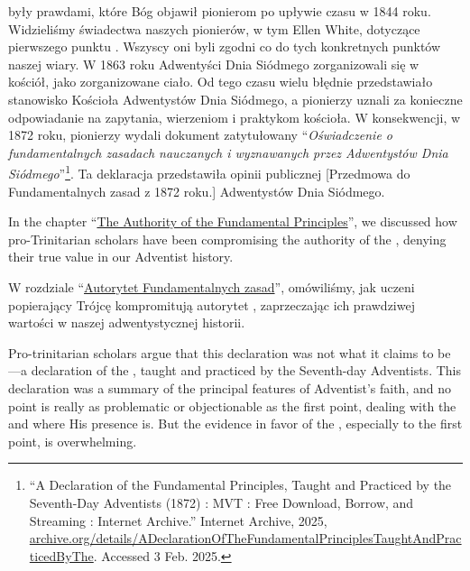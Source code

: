  były prawdami, które Bóg objawił pionierom po upływie czasu w 1844 roku. Widzieliśmy świadectwa naszych pionierów, w tym Ellen White, dotyczące pierwszego punktu . Wszyscy oni byli zgodni co do tych konkretnych punktów naszej wiary. W 1863 roku Adwentyści Dnia Siódmego zorganizowali się w kościół, jako zorganizowane ciało. Od tego czasu wielu błędnie przedstawiało stanowisko Kościoła Adwentystów Dnia Siódmego, a pionierzy uznali za konieczne odpowiadanie na zapytania,  wierzeniom i praktykom kościoła. W konsekwencji, w 1872 roku, pionierzy wydali dokument zatytułowany “\textit{Oświadczenie o fundamentalnych zasadach nauczanych i wyznawanych przez Adwentystów Dnia Siódmego}”\footnote{“A Declaration of the Fundamental Principles, Taught and Practiced by the Seventh-Day Adventists (1872) : MVT : Free Download, Borrow, and Streaming : Internet Archive.” Internet Archive, 2025, \href{https://archive.org/details/ADeclarationOfTheFundamentalPrinciplesTaughtAndPracticedByThe}{archive.org/details/ADeclarationOfTheFundamentalPrinciplesTaughtAndPracticedByThe}. Accessed 3 Feb. 2025.}. Ta deklaracja przedstawiła opinii publicznej [Przedmowa do Fundamentalnych zasad z 1872 roku.] Adwentystów Dnia Siódmego.


In the chapter “\hyperref[chap:authority]{The Authority of the Fundamental Principles}”, we discussed how pro-Trinitarian scholars have been compromising the authority of the , denying their true value in our Adventist history.


W rozdziale “\hyperref[chap:authority]{Autorytet Fundamentalnych zasad}”, omówiliśmy, jak uczeni popierający Trójcę kompromitują autorytet , zaprzeczając ich prawdziwej wartości w naszej adwentystycznej historii.


Pro-trinitarian scholars argue that this declaration was not what it claims to be—a declaration of the , taught and practiced by the Seventh-day Adventists. This declaration was a summary of the principal features of Adventist’s faith, and no point is really as problematic or objectionable as the first point, dealing with the  and where His presence is. But the evidence in favor of the , especially to the first point, is overwhelming.


